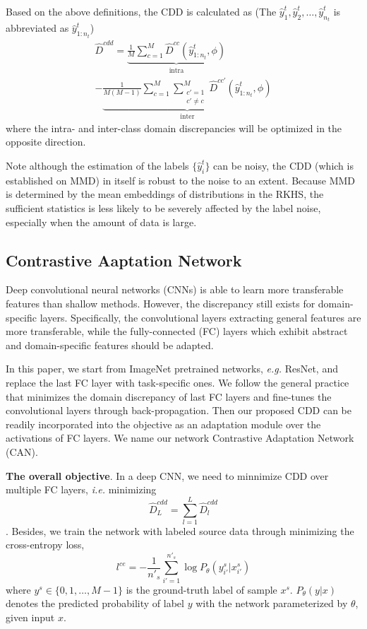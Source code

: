 \documentclass[conference]{IEEEtran}
\begin{document}
Based on the above definitions, the CDD is calculated as (The $\hat{y}^{t}_{1}, \hat{y}^{t}_{2}, \ldots, \hat{y}^{t}_{n_t}$ is abbreviated as $\hat{y}^{t}_{1:n_t}$)
\begin{equation}
    \begin{split}
       \hat{D}^{cdd} = \underbrace{\frac{1}{M} \sum_{c=1}^{M} \hat{D}^{cc}( \hat{y}^{t}_{1:n_t} , \phi)}_{\text{intra}} \\
        - \underbrace{\frac{1}{M(M-1)} \sum_{c=1}^{M} \sum_{\substack{c'=1 \\ c' \neq c}}^{M} \hat{D}^{cc'} ( \hat{y}^{t}_{1:n_t} , \phi)}_{\text{inter}}
    \end{split}
\end{equation}
where the intra- and inter-class domain discrepancies will be optimized in the opposite direction.

Note although the estimation of the labels $\{\hat{y}^t_i\}$ can be noisy, the CDD (which is established on MMD) in itself is robust to the noise to an extent.
Because MMD is determined by the mean embeddings of distributions in the RKHS, the sufficient statistics is less likely to be severely affected by the label noise, especially when the amount of data is large.

\subsection{Contrastive Aaptation Network}
Deep convolutional neural networks (CNNs) is able to learn more transferable features than shallow methods.
However, the discrepancy still exists for domain-specific layers.
Specifically, the convolutional layers extracting general features are more transferable, while the fully-connected (FC) layers which exhibit abstract and domain-specific features should be adapted.

In this paper, we start from ImageNet pretrained networks, \textit{e.g.} ResNet, and replace the last FC layer with task-specific ones. 
We follow the general practice that minimizes the domain discrepancy of last FC layers and fine-tunes the convolutional layers through back-propagation.
Then our proposed CDD can be readily incorporated into the objective as an adaptation module over the activations of FC layers.
We name our network Contrastive Adaptation Network (CAN).

\textbf{The overall objective}. In a deep CNN, we need to minnimize CDD over multiple FC layers, \textit{i.e.} minimizing
\begin{equation}
    \hat{D}^{cdd}_{L} = \sum_{l=1}^{L} \hat{D}^{cdd}_{l}
\end{equation}.
Besides, we train the network with labeled source data through minimizing the cross-entropy loss,
\begin{equation}
    l^{ce} = - \frac{1}{{n'}_s} \sum_{i'=1}^{{n'}_s} \log P_\theta(y^s_{i'}|x^s_{i'})
\end{equation}
where $y^s \in \{0,1, \ldots, M-1\}$ is the ground-truth label of sample $x^s$. 
$P_\theta(y|x)$ denotes the predicted probability of label $y$ with the network parameterized by $\theta$, given input $x$.
\end{document}
